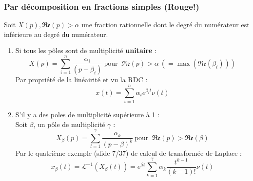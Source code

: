 		\subsubsection{Par décomposition en fractions simples (Rouge!)}
		Soit $X(p), \mathfrak{Re}(p) > \alpha$ une fraction rationnelle dont le degré du 
		numérateur est inférieure au degré du numérateur.
		\begin{enumerate}
		\item Si tous les pôles sont de multiplicité \textbf{unitaire} : 
		\begin{equation}
		X(p) = \sum_{i=1}^n \dfrac{\alpha_i}{(p-\beta_i)}\ \text{pour }\ \mathfrak{Re}(p) >
		\alpha\ (=\max(\mathfrak{Re}(\beta_i)))
		\end{equation}
		Par propriété de la linéairité et vu la RDC :
		\begin{equation}
		x(t) = \sum_{i=1}^n \alpha_i e^{\beta_it}\nu(t)
		\label{eq:Sl8}
		\end{equation}
		\item S'il y a des poles de multiplicité supérieure à 1 :\\
		Soit $\beta$, un pôle de multiplicité $\gamma$ :
		\begin{equation}
		X_\beta(p) = \sum_{l=1}^\gamma \dfrac{\alpha_k}{(p-\beta)^k}\ \text{pour }\ \mathfrak{Re}(p) >
		\mathfrak{Re}(\beta)
		\end{equation}
		Par le quatrième exemple (slide 7/37) de calcul de transformée de Laplace :
		\begin{equation}
		x_\beta(t) = \mathcal{L}^{-1}(X_\beta(t)) = e^{\beta t}\sum_{k=1}^\gamma \alpha_k
		\dfrac{t^{k-1}}{(k-1)!}\nu(t)
		\end{equation}
		\end{enumerate}


